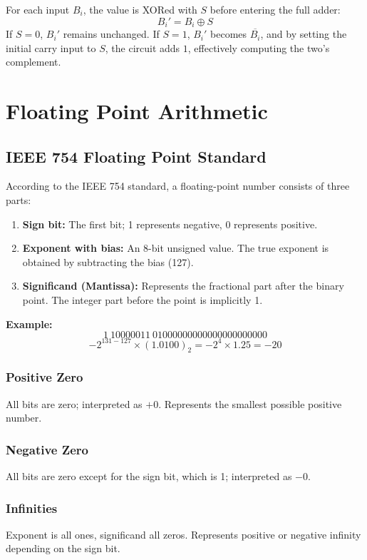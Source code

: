 \documentclass{article}
\begin{document}
For each input $B_i$, the value is XORed with $S$ before entering the full adder:
\[
B_i' = B_i \oplus S
\]
If $S = 0$, $B_i'$ remains unchanged.  
If $S = 1$, $B_i'$ becomes $\overline{B_i}$, and by setting the initial carry input to $S$, the circuit adds $1$, effectively computing the two’s complement.

\section{Floating Point Arithmetic}

\subsection{IEEE 754 Floating Point Standard}
According to the IEEE 754 standard, a floating-point number consists of three parts:
\begin{enumerate}
  \item \textbf{Sign bit:} The first bit; 1 represents negative, 0 represents positive.
  \item \textbf{Exponent with bias:} An 8-bit unsigned value. The true exponent is obtained by subtracting the bias (127).
  \item \textbf{Significand (Mantissa):} Represents the fractional part after the binary point. The integer part before the point is implicitly 1.
\end{enumerate}

\textbf{Example:}  
\[
1\ 10000011\ 01000000000000000000000
\]
\[
- 2^{131 - 127} \times (1.0100)_2 = -2^4 \times 1.25 = -20
\]

\subsubsection{Positive Zero}
All bits are zero; interpreted as $+0$. Represents the smallest possible positive number.

\subsubsection{Negative Zero}
All bits are zero except for the sign bit, which is 1; interpreted as $-0$.

\subsubsection{Infinities}
Exponent is all ones, significand all zeros. Represents positive or negative infinity depending on the sign bit.
\end{document}
